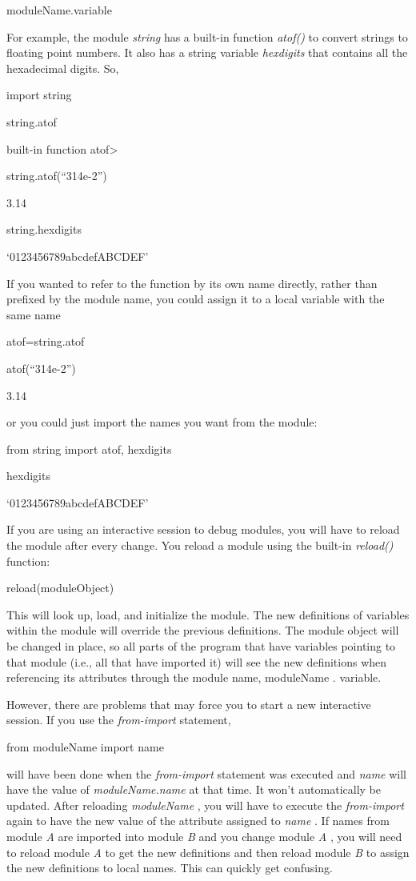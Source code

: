 moduleName.variable

For example, the module
\emph{string} has a built-in function \emph{atof()} to convert strings
to floating point numbers. It also has a string variable
\emph{hexdigits} that contains all the hexadecimal digits. So,


import string


string.atof

built-in function
atof\textgreater{}


string.atof(``314e-2'')

3.14


string.hexdigits

`0123456789abcdefABCDEF'

If you wanted to refer to the
function by its own name directly, rather than prefixed by the module
name, you could assign it to a local variable with the same name


atof=string.atof


atof(``314e-2'')

3.14

or you could just import the names
you want from the module:


from string import atof, hexdigits


hexdigits

`0123456789abcdefABCDEF'

If you are using an interactive
session to debug modules, you will have to reload the module after every
change. You reload a module using the built-in \emph{reload()} function:

reload(moduleObject)

This will look up, load, and
initialize the module. The new definitions of variables within the
module will override the previous definitions. The module object will be
changed in place, so all parts of the program that have variables
pointing to that module (i.e., all that have imported it) will see the
new definitions when referencing its attributes through the module name,
moduleName . variable.

However, there are problems that
may force you to start a new interactive session. If you use the
\emph{from-import} statement,

from moduleName import name


will have been done when the \emph{from-import} statement was executed
and \emph{name} will have the value of \emph{moduleName.name} at that
time. It won't automatically be updated. After reloading
\emph{moduleName} , you will have to execute the \emph{from-import}
again to have the new value of the attribute assigned to \emph{name} .
If names from module \emph{A} are imported into module \emph{B} and you
change module \emph{A} , you will need to reload module \emph{A} to get
the new definitions and then reload module \emph{B} to assign the new
definitions to local names. This can quickly get confusing.

